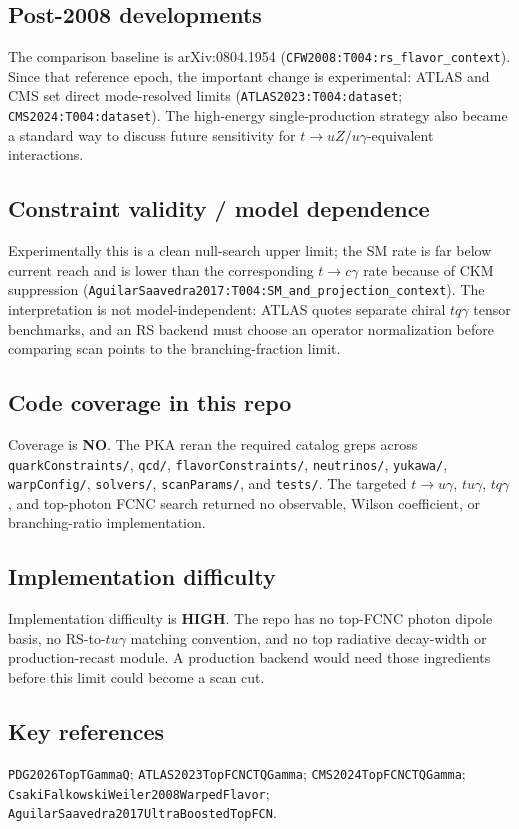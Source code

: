 \subsection*{Post-2008 developments}
The comparison baseline is arXiv:0804.1954
(\texttt{CFW2008:T004:rs\_flavor\_context}).  Since that reference epoch,
the important change is experimental: ATLAS and CMS set direct mode-resolved
limits (\texttt{ATLAS2023:T004:dataset}; \texttt{CMS2024:T004:dataset}).  The
high-energy single-production strategy also became a standard way to discuss
future sensitivity for \(t\to uZ/u\gamma\)-equivalent interactions.

\subsection*{Constraint validity / model dependence}
Experimentally this is a clean null-search upper limit; the SM rate is far
below current reach and is lower than the corresponding \(t\to c\gamma\) rate
because of CKM suppression
(\texttt{AguilarSaavedra2017:T004:SM\_and\_projection\_context}).  The
interpretation is not model-independent: ATLAS quotes separate chiral
\(tq\gamma\) tensor benchmarks, and an RS backend must choose an operator
normalization before comparing scan points to the branching-fraction limit.

\subsection*{Code coverage in this repo}
Coverage is \textbf{NO}.  The PKA reran the required catalog greps across
\texttt{quarkConstraints/}, \texttt{qcd/}, \texttt{flavorConstraints/},
\texttt{neutrinos/}, \texttt{yukawa/}, \texttt{warpConfig/}, \texttt{solvers/},
\texttt{scanParams/}, and \texttt{tests/}.  The targeted \(t\to u\gamma\),
\(tu\gamma\), \(tq\gamma\), and top-photon FCNC search returned no observable,
Wilson coefficient, or branching-ratio implementation.

\subsection*{Implementation difficulty}
Implementation difficulty is \textbf{HIGH}.  The repo has no top-FCNC photon
dipole basis, no RS-to-\(tu\gamma\) matching convention, and no top radiative
decay-width or production-recast module.  A production backend would need those
ingredients before this limit could become a scan cut.

\subsection*{Key references}
\texttt{PDG2026TopTGammaQ}; \texttt{ATLAS2023TopFCNCTQGamma};
\texttt{CMS2024TopFCNCTQGamma}; \texttt{CsakiFalkowskiWeiler2008WarpedFlavor};
\texttt{AguilarSaavedra2017UltraBoostedTopFCN}.
